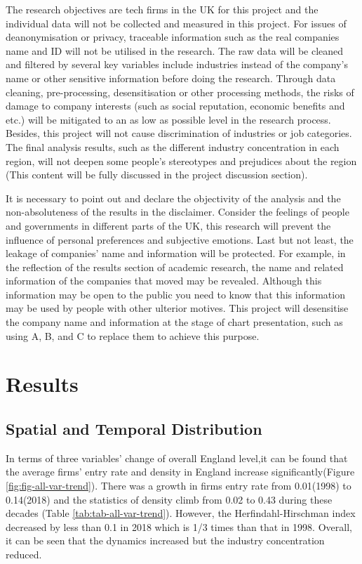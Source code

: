 \documentclass[
  12pt,
  oneside]{book}
\begin{document}
The research objectives are tech firms in the UK for this project and the individual data will not be collected and measured in this project. For issues of deanonymisation or privacy, traceable information such as the real companies name and ID will not be utilised in the research. The raw data will be cleaned and filtered by several key variables include industries instead of the company's name or other sensitive information before doing the research. Through data cleaning, pre-processing, desensitisation or other processing methods, the risks of damage to company interests (such as social reputation, economic benefits and etc.) will be mitigated to an as low as possible level in the research process. Besides, this project will not cause discrimination of industries or job categories. The final analysis results, such as the different industry concentration in each region, will not deepen some people's stereotypes and prejudices about the region (This content will be fully discussed in the project discussion section).

It is necessary to point out and declare the objectivity of the analysis and the non-absoluteness of the results in the disclaimer. Consider the feelings of people and governments in different parts of the UK, this research will prevent the influence of personal preferences and subjective emotions. Last but not least, the leakage of companies' name and information will be protected. For example, in the reflection of the results section of academic research, the name and related information of the companies that moved may be revealed. Although this information may be open to the public you need to know that this information may be used by people with other ulterior motives. This project will desensitise the company name and information at the stage of chart presentation, such as using A, B, and C to replace them to achieve this purpose.

\hypertarget{results}{%
\chapter{Results}\label{results}}

\hypertarget{spatial-and-temporal-distribution}{%
\section{Spatial and Temporal Distribution}\label{spatial-and-temporal-distribution}}

In terms of three variables' change of overall England level,it can be found that the average firms' entry rate and density in England increase significantly(Figure \ref{fig:fig-all-var-trend}). There was a growth in firms entry rate from 0.01(1998) to 0.14(2018) and the statistics of density climb from 0.02 to 0.43 during these decades (Table \ref{tab:tab-all-var-trend}). However, the Herfindahl-Hirschman index decreased by less than 0.1 in 2018 which is 1/3 times than that in 1998. Overall, it can be seen that the dynamics increased but the industry concentration reduced.
\end{document}
